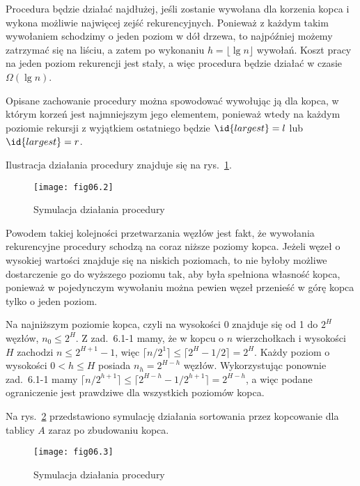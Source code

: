 \exercise %
Procedura  będzie działać najdłużej, jeśli zostanie wywołana dla korzenia kopca i wykona możliwie najwięcej zejść rekurencyjnych. Ponieważ z każdym takim wywołaniem schodzimy o jeden poziom w dół drzewa, to najpóźniej możemy zatrzymać się na liściu, a zatem po wykonaniu $h=\lfloor\lg n\rfloor$ wywołań. Koszt pracy na jeden poziom rekurencji jest stały, a więc procedura będzie działać w czasie $\Omega(\lg n)$.

Opisane zachowanie procedury można spowodować wywołując ją dla kopca, w którym korzeń jest najmniejszym jego elementem, ponieważ wtedy na każdym poziomie rekursji z wyjątkiem ostatniego będzie $\id{largest}=l$ lub $\id{largest}=r$.


\exercise %
Ilustracja działania procedury  znajduje się na rys.~\ref{fig:6.3-1}.
\begin{figure}[!h]
	\begin{center}
		\texttt{[image: fig06.2]}
	\end{center}
	\caption{Symulacja działania procedury } \label{fig:6.3-1}
\end{figure}

\exercise %
Powodem takiej kolejności przetwarzania węzłów jest fakt, że wywołania rekurencyjne procedury  schodzą na coraz niższe poziomy kopca. Jeżeli węzeł o wysokiej wartości znajduje się na niskich poziomach, to nie byłoby możliwe dostarczenie go do wyższego poziomu tak, aby była spełniona własność kopca, ponieważ w pojedynczym wywołaniu  można pewien węzeł przenieść w górę kopca tylko o jeden poziom.

\exercise %
Na najniższym poziomie kopca, czyli na wysokości 0 znajduje się od 1 do $2^H$ węzłów, $n_0\le2^H$. Z zad.~6.1-1 mamy, że w kopcu o $n$ wierzchołkach i wysokości $H$ zachodzi $n\le2^{H+1}-1$, więc $\lceil n/2^1\rceil\le\lceil2^H-1/2\rceil=2^H$. Każdy poziom o wysokości $0<h\le H$ posiada $n_h=2^{H-h}$ węzłów. Wykorzystując ponownie zad.~6.1-1 mamy $\lceil n/2^{h+1}\rceil\le\lceil2^{H-h}-1/2^{h+1}\rceil=2^{H-h}$, a więc podane ograniczenie jest prawdziwe dla wszystkich poziomów kopca.


\exercise %
Na rys.~\ref{fig:6.4-1} przedstawiono symulację działania sortowania przez kopcowanie dla tablicy $A$ zaraz po zbudowaniu kopca.
\begin{figure}[!h]
	\begin{center}
		\texttt{[image: fig06.3]}
	\end{center}
	\caption{Symulacja działania procedury } \label{fig:6.4-1}
\end{figure}

